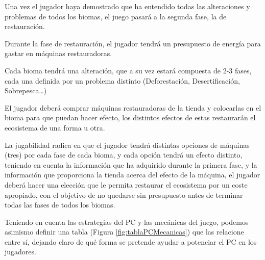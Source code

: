 Una vez el jugador haya demostrado que ha entendido todas las alteraciones y problemas de todos los biomas, el juego pasará a la segunda fase, la de restauración.
\begin{compactitem}
    \item Durante la fase de restauración, el jugador tendrá un presupuesto de energía para gastar en máquinas restauradoras.
    \item Cada bioma tendrá una alteración, que a su vez estará compuesta de 2-3 fases, cada una definida por un problema distinto (Deforestación, Desertificación, Sobrepesca…)
    \item El jugador deberá comprar máquinas restauradoras de la tienda y colocarlas en el bioma para que puedan hacer efecto, los distintos efectos de estas restaurarán el ecosistema de una forma u otra.
    \item La jugabilidad radica en que el jugador tendrá distintas opciones de máquinas (tres) por cada fase de cada bioma, y cada opción tendrá un efecto distinto, teniendo en cuenta la información que ha adquirido durante la primera fase, y la información que proporciona la tienda acerca del efecto de la máquina, el jugador deberá hacer una elección que le permita restaurar el ecosistema por un coste apropiado, con el objetivo de no quedarse sin presupuesto antes de terminar todas las fases de todos los biomas.
\end{compactitem}
Teniendo en cuenta las estrategias del PC y las mecánicas del juego, podemos asimismo definir una tabla (Figura \ref{fig:tablaPCMecanicas}) que las relacione entre sí, dejando claro de qué forma se pretende ayudar a potenciar el PC en los jugadores.
